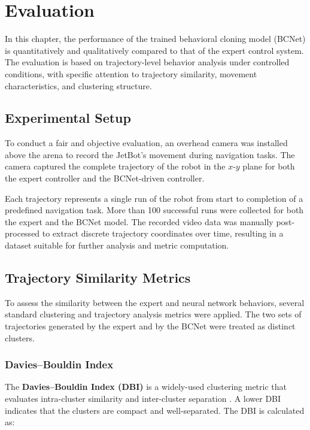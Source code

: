 \chapter{Evaluation}
\label{cha:evaluation}

In this chapter, the performance of the trained behavioral cloning model (BCNet) is quantitatively and qualitatively compared to that of the expert control system. The evaluation is based on trajectory-level behavior analysis under controlled conditions, with specific attention to trajectory similarity, movement characteristics, and clustering structure.

\section{Experimental Setup}

To conduct a fair and objective evaluation, an overhead camera was installed above the arena to record the JetBot's movement during navigation tasks. The camera captured the complete trajectory of the robot in the $x$-$y$ plane for both the expert controller and the BCNet-driven controller.

Each trajectory represents a single run of the robot from start to completion of a predefined navigation task. More than 100 successful runs were collected for both the expert and the BCNet model. The recorded video data was manually post-processed to extract discrete trajectory coordinates over time, resulting in a dataset suitable for further analysis and metric computation.

\section{Trajectory Similarity Metrics}

To assess the similarity between the expert and neural network behaviors, several standard clustering and trajectory analysis metrics were applied. The two sets of trajectories generated by the expert and by the BCNet were treated as distinct clusters.

\subsection{Davies–Bouldin Index}

The \textbf{Davies–Bouldin Index (DBI)} is a widely-used clustering metric that evaluates intra-cluster similarity and inter-cluster separation \autocite{4766909}. A lower DBI indicates that the clusters are compact and well-separated. The DBI is calculated as:

